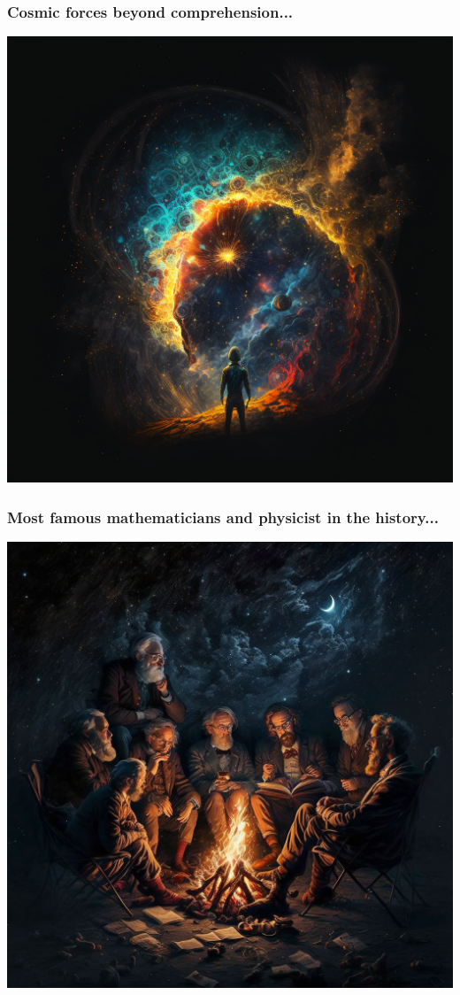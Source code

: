 \documentclass[9pt,table,xcolor=dvipsnames]{beamer}%
\theoremstyle{definition}
\theoremstyle{plain}
\begin{document}
\begin{frame}[fragile,t] %
  \frametitle{Cosmic forces beyond comprehension...}
  \begin{center}
    \includegraphics[scale=0.22]{./figs/chenle02_Cosmic_forces_beyond_comprehension.png}
  \end{center}
\end{frame}
\begin{frame}[fragile,t] %
  \frametitle{Most famous mathematicians and physicist in the history...}
  \begin{center}
    \includegraphics[scale=0.22]{./figs/chenle02_Most_famous_mathematicians_and_physists_in_the_history.png}
  \end{center}
\end{frame}
\end{document}
